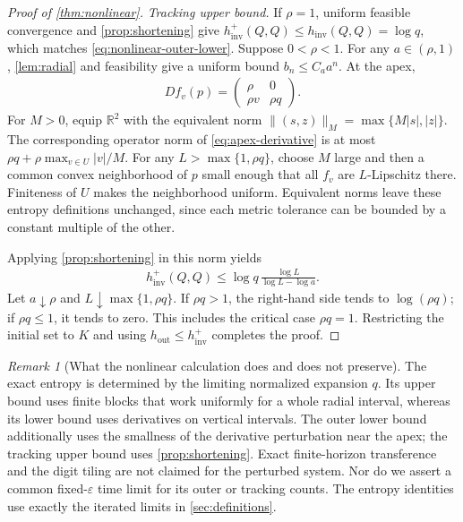 \documentclass[11pt,a4paper]{article}
\theoremstyle{definition}
\theoremstyle{remark}
\newtheorem{remark}[theorem]{Remark}
\begin{document}
\begin{proof}[Proof of \cref{thm:nonlinear}]
\emph{Tracking upper bound.}
If \(\rho=1\), uniform feasible convergence and \cref{prop:shortening} give
\(h_{\mathrm{inv}}^+(Q,Q)\leq h_{\mathrm{inv}}(Q,Q)=\log q\), which matches \eqref{eq:nonlinear-outer-lower}.
Suppose \(0<\rho<1\). For any \(a\in(\rho,1)\), \cref{lem:radial} and feasibility give a uniform bound \(b_n\leq C_a a^n\).
At the apex,
\begin{align}\label{eq:apex-derivative}
 Df_v(p)=
 \begin{pmatrix}
 \rho&0\\
 \rho v&\rho q
 \end{pmatrix}.
\end{align}
For \(M>0\), equip \(\mathbb R^2\) with the equivalent norm
\(\|(s,z)\|_M=\max\{M|s|,|z|\}\).
The corresponding operator norm of \eqref{eq:apex-derivative} is at most
\(\rho q+\rho\max_{v\in U}|v|/M\).
For any \(L>\max\{1,\rho q\}\), choose \(M\) large and then a common convex neighborhood of \(p\) small enough that all \(f_v\) are \(L\)-Lipschitz there. Finiteness of \(U\) makes the neighborhood uniform. Equivalent norms leave these entropy definitions unchanged, since each metric tolerance can be bounded by a constant multiple of the other.

Applying \cref{prop:shortening} in this norm yields
\begin{align}
 h_{\mathrm{inv}}^+(Q,Q)
 \leq \log q\,\frac{\log L}{\log L-\log a}.
\end{align}
Let \(a\downarrow\rho\) and \(L\downarrow\max\{1,\rho q\}\).
If \(\rho q>1\), the right-hand side tends to \(\log(\rho q)\); if \(\rho q\leq1\), it tends to zero. This includes the critical case \(\rho q=1\). Restricting the initial set to \(K\) and using \(h_{\mathrm{out}}\leq h_{\mathrm{inv}}^+\) completes the proof.
\end{proof}

\begin{remark}[What the nonlinear calculation does and does not preserve]\label{rem:nonlinear-scope}
The exact entropy is determined by the limiting normalized expansion \(q\). Its upper bound uses finite blocks that work uniformly for a whole radial interval, whereas its lower bound uses derivatives on vertical intervals. The outer lower bound additionally uses the smallness of the derivative perturbation near the apex; the tracking upper bound uses \cref{prop:shortening}. Exact finite-horizon transference and the digit tiling are not claimed for the perturbed system. Nor do we assert a common fixed-\(\varepsilon\) time limit for its outer or tracking counts. The entropy identities use exactly the iterated limits in \cref{sec:definitions}.
\end{remark}
\end{document}
